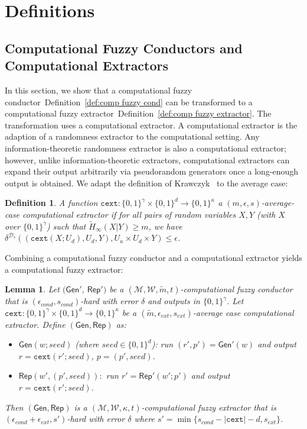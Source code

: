 \documentclass[11pt]{article}
\newcommand{\defref}[1]{\mbox{Definition~\ref{#1}}}
\newcommand{\class}[1]{{\ensuremath{\mathsf{#1}}}}
\newcommand{\gen}{\ensuremath{\class{Gen}}\xspace}
\newcommand{\rep}{\ensuremath{\class{Rep}}\xspace}
\newcommand{\zo}{\ensuremath{\{0, 1\}}}
\newcommand{\cext}{\ensuremath{\mathtt{cext}}}
\newtheorem{lemma}[theorem]{Lemma}
\newtheorem{definition}[theorem]{Definition}
\begin{document}
\appendix

\section{Definitions}
\subsection{Computational Fuzzy Conductors and Computational Extractors}
\label{sec:further defs}
In this section, we show that a computational fuzzy conductor~\defref{def:comp fuzzy cond} can be transformed to a computational fuzzy extractor~\defref{def:comp fuzzy extractor}.  The transformation uses a computational extractor.
A computational extractor is the adaption of a randomness extractor to the computational setting.  Any information-theoretic randomness extractor is also a computational extractor; however, unlike information-theoretic extractors, computational extractors can expand their output arbitrarily via pseudorandom generators once a long-enough output is obtained. We adapt the definition of Krawczyk~\cite{krawczyk2010cryptographic} to the average case:
\begin{definition}
A function $\cext: \zo^\gamma \times \{0,1\}^d \rightarrow \{0,1\}^\kappa$ a \emph{$(m, \epsilon, s)$-average-case computational extractor} if for all pairs
of random variables $X, Y$ (with $X$ over $\zo^\gamma$) such that
$\tilde{H}_\infty(X|Y) \ge m$, we have $\delta^{\mathcal{D}_{s}}((\cext(X; U_d), U_d, Y), U_\kappa\times
U_d \times Y) \le \epsilon$.
\end{definition}

Combining a computational fuzzy conductor and a computational extractor yields a computational fuzzy extractor:

\begin{lemma}
\label{lem:cond and cext}
Let $(\gen'$, $\rep')$ be a $(\mathcal{M}, \mathcal{W}, \tilde{m}, t)$-computational fuzzy conductor that is $(\epsilon_{cond}, s_{cond})$-hard with error $\delta$ and outputs in $\zo^\gamma$.  Let $\cext:\zo^\gamma\times \zo^d\rightarrow \zo^\kappa$ be a $(\tilde{m}, \epsilon_{ext}, s_{ext})$-average case computational extractor.  Define $(\gen, \rep)$ as:
\begin{itemize}
\item $\gen(w; seed)$ (where $seed\in \zo^d$): run $(r', p')= \gen'(w)$ and output $r = \cext(r'; seed)$, $p = (p', seed)$.
\item $\rep(w', (p', seed)):$ run $r' = \rep'(w'; p')$ and output $r = \cext(r'; seed)$.
\end{itemize}
Then $(\gen, \rep)$ is a $(\mathcal{M}, \mathcal{W}, \kappa, t)$-computational fuzzy extractor that is $(\epsilon_{cond}+\epsilon_{ext}, s')$-hard with error $\delta$ where $s' = \min\{s_{cond} - |\cext| -d, s_{ext}\}$.
\end{lemma}
\end{document}
